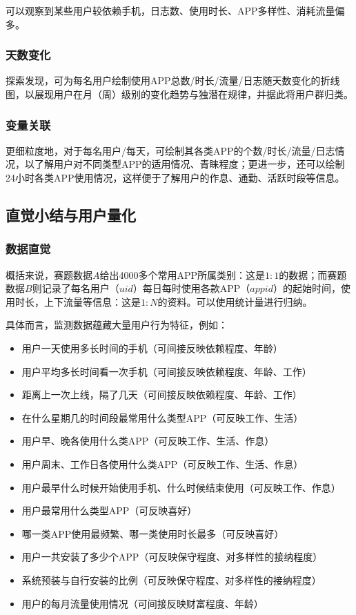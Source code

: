 \documentclass[withoutpreface,bwprint]{cumcmthesis}
\begin{document}
可以观察到某些用户较依赖手机，日志数、使用时长、APP多样性、消耗流量偏多。

\subsubsection{天数变化}

探索发现，可为每名用户绘制使用APP总数/时长/流量/日志随天数变化的折线图，以展现用户在月（周）级别的变化趋势与独潜在规律，并据此将用户群归类。

\subsubsection{变量关联}

更细粒度地，对于每名用户/每天，可绘制其各类APP的个数/时长/流量/日志情况，以了解用户对不同类型APP的适用情况、青睐程度；更进一步，还可以绘制24小时各类APP使用情况，这样便于了解用户的作息、通勤、活跃时段等信息。

\subsection{直觉小结与用户量化}

\subsubsection{数据直觉}
概括来说，赛题数据$A$给出4000多个常用APP所属类别：这是$1:1$的数据；而赛题数据$B$则记录了每名用户（$uid$）每日每时使用各款APP（$appid$）的起始时间，使用时长，上下流量等信息：这是$1:N$的资料。可以使用统计量进行归纳。

具体而言，监测数据蕴藏大量用户行为特征，例如：
\begin{itemize}
    \item 用户一天使用多长时间的手机（可间接反映依赖程度、年龄）
    \item 用户平均多长时间看一次手机（可间接反映依赖程度、年龄、工作）
    \item 距离上一次上线，隔了几天（可间接反映依赖程度、年龄、工作）
    \item 在什么星期几的时间段最常用什么类型APP（可反映工作、生活）
    \item 用户早、晚各使用什么类APP（可反映工作、生活、作息）
    \item 用户周末、工作日各使用什么类APP（可反映工作、生活、作息）
    \item 用户最早什么时候开始使用手机、什么时候结束使用（可反映工作、作息）
    \item 用户最常用什么类型APP（可反映喜好）
    \item 哪一类APP使用最频繁、哪一类使用时长最多（可反映喜好）
    \item 用户一共安装了多少个APP（可反映保守程度、对多样性的接纳程度）
    \item 系统预装与自行安装的比例（可反映保守程度、对多样性的接纳程度）
    \item 用户的每月流量使用情况（可间接反映财富程度、年龄）
\end{itemize}
\end{document}
